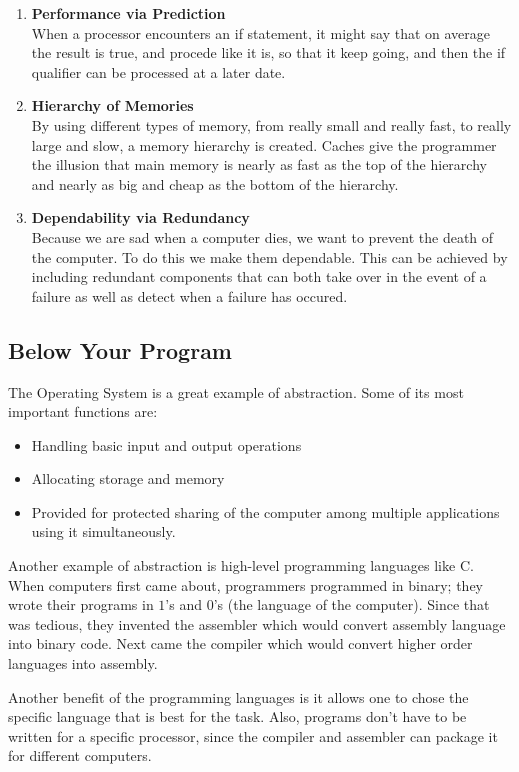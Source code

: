 \documentclass[10pt]{article}
\begin{document}
\begin{enumerate}
\item \textbf{Performance via Prediction}\\
  When a processor encounters an if statement, it might say that on average the result is true, and procede like it is, so that it keep going, and then the if qualifier can be processed at a later date.

\item \textbf{Hierarchy of Memories}\\
  By using different types of memory, from really small and really fast, to really large and slow, a memory hierarchy is created.  Caches give the programmer the illusion that main memory is nearly as fast as the top of the hierarchy and nearly as big and cheap as the bottom of the hierarchy.

\item \textbf{Dependability via Redundancy}\\
Because we are sad when a computer dies, we want to prevent the death of the computer.  To do this we make them dependable.  This can be achieved by including redundant components that can both take over in the event of a failure as well as detect when a failure has occured.
\end{enumerate}

\subsection{Below Your Program}\label{subsec:}
The Operating System is a great example of abstraction.  Some of its most important functions are:
\begin{itemize}
\item Handling basic input and output operations
\item Allocating storage and memory
\item Provided for protected sharing of the computer among multiple applications using it simultaneously.
\end{itemize}
Another example of abstraction is high-level programming languages like C.  When computers first came about, programmers programmed in binary; they wrote their programs in $1$'s and $0$'s (the language of the computer).  Since that was tedious, they invented the assembler which would convert assembly language into binary code.  Next came the compiler which would convert higher order languages into assembly.

Another benefit of the programming languages is it allows one to chose the specific language that is best for the task.  Also, programs don't have to be written for a specific processor, since the compiler and assembler can package it for different computers.
\end{document}
